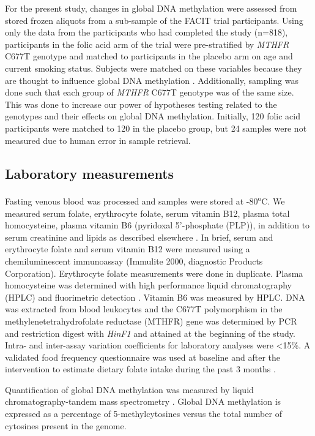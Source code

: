 \noindent For the present study, changes in global DNA methylation were assessed from stored frozen aliquots from a sub-sample of the FACIT trial participants. Using only the data from the participants who had completed the study (n=818), participants in the folic acid arm of the trial were pre-stratified by \emph{MTHFR} C677T genotype and matched to participants in the placebo arm on age and current smoking status. Subjects were matched on these variables because they are thought to influence global DNA methylation \cite{c420,c421,c422,c423,c424,c425}. Additionally, sampling was done such that each group of \emph{MTHFR} C677T genotype was of the same size. This was done to increase our power of hypotheses testing related to the genotypes and their effects on global DNA methylation. Initially, 120 folic acid participants were matched to 120 in the placebo group, but 24 samples were not measured due to human error in sample retrieval.

\subsection{Laboratory measurements} %
\noindent Fasting venous blood was processed and samples were stored at -80\textsuperscript{o}C. We measured serum folate, erythrocyte folate, serum vitamin B12, plasma total homocysteine, plasma vitamin B6 (pyridoxal 5'-phosphate (PLP)), in addition to serum creatinine and lipids as described elsewhere \cite{c416}. In brief, serum and erythrocyte folate and serum vitamin B12 were measured using a chemiluminescent immunoassay (Immulite\textsuperscript{\textregistered} 2000, diagnostic Products Corporation). Erythrocyte folate measurements were done in duplicate. Plasma homocysteine was determined with high performance liquid chromatography (HPLC) and fluorimetric detection \cite{c426}. Vitamin B6 was measured by HPLC. DNA was extracted from blood leukocytes and the C677T polymorphism in the methylenetetrahydrofolate reductase (MTHFR) gene was determined by PCR and restriction digest with \emph{HinF1} and attained at the beginning of the study. Intra- and inter-assay variation coefficients for laboratory analyses were <15\%. A validated food frequency questionnaire was used at baseline and after the intervention to estimate dietary folate intake during the past 3 months \cite{c427}. 
 
\noindent Quantification of global DNA methylation was measured by liquid chromatography-tandem mass spectrometry \cite{c428}. Global DNA methylation is expressed as a percentage of 5-methylcytosines versus the total number of cytosines present in the genome. 
 
